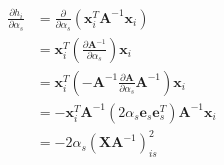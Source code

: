\documentclass[10pt]{article}
\begin{document}
\begin{align*}\begin{split}
\frac{\partial h_i}{\partial \alpha_s} &=
\frac{\partial}{\partial \alpha_s} \left(
\boldsymbol x_i^T \boldsymbol A^{-1} \boldsymbol x_i \right) \\
&= \boldsymbol x_i^T 
\left(\frac{\partial \boldsymbol A^{-1}}{\partial \alpha_s}\right) \boldsymbol x_i \\
&= \boldsymbol x_i^T 
\left( - \boldsymbol A^{-1} \frac{\partial \boldsymbol A}{\partial \alpha_s}
\boldsymbol A^{-1} \right)
\boldsymbol x_i \\
&= - \boldsymbol x_i^T \boldsymbol A^{-1}
\left( 2 \alpha_s \boldsymbol e_s \boldsymbol e_s^T \right)
\boldsymbol A^{-1} \boldsymbol x_i \\
&= -2 \alpha_s \left( \boldsymbol X \boldsymbol A^{-1} \right)_{is}^2 \\
\end{split}\end{align*}
\end{document}
